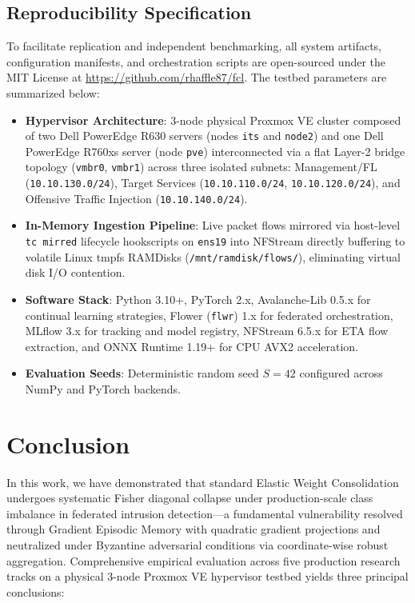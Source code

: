 \documentclass[journal,10pt,twocolumn]{IEEEtran}
\begin{document}
\subsection*{Reproducibility Specification}
To facilitate replication and independent benchmarking, all system artifacts, configuration manifests, and orchestration scripts are open-sourced under the MIT License at \url{https://github.com/rhaffle87/fcl}. The testbed parameters are summarized below:
\begin{itemize}
    \item \textbf{Hypervisor Architecture}: 3-node physical Proxmox VE cluster composed of two Dell PowerEdge R630 servers (nodes \texttt{its} and \texttt{node2}) and one Dell PowerEdge R760xs server (node \texttt{pve}) interconnected via a flat Layer-2 bridge topology (\texttt{vmbr0}, \texttt{vmbr1}) across three isolated subnets: Management/FL (\texttt{10.10.130.0/24}), Target Services (\texttt{10.10.110.0/24}, \texttt{10.10.120.0/24}), and Offensive Traffic Injection (\texttt{10.10.140.0/24}).
    \item \textbf{In-Memory Ingestion Pipeline}: Live packet flows mirrored via host-level \texttt{tc mirred} lifecycle hookscripts on \texttt{ens19} into NFStream directly buffering to volatile Linux tmpfs RAMDisks (\texttt{/mnt/ramdisk/flows/}), eliminating virtual disk I/O contention.
    \item \textbf{Software Stack}: Python 3.10+, PyTorch 2.x, Avalanche-Lib 0.5.x for continual learning strategies, Flower (\texttt{flwr}) 1.x for federated orchestration, MLflow 3.x for tracking and model registry, NFStream 6.5.x for ETA flow extraction, and ONNX Runtime 1.19+ for CPU AVX2 acceleration.
    \item \textbf{Evaluation Seeds}: Deterministic random seed $S=42$ configured across NumPy and PyTorch backends.
\end{itemize}

\section{Conclusion}
\balance

In this work, we have demonstrated that standard Elastic Weight Consolidation undergoes systematic Fisher diagonal collapse under production-scale class imbalance in federated intrusion detection---a fundamental vulnerability resolved through Gradient Episodic Memory with quadratic gradient projections and neutralized under Byzantine adversarial conditions via coordinate-wise robust aggregation. Comprehensive empirical evaluation across five production research tracks on a physical 3-node Proxmox VE hypervisor testbed yields three principal conclusions:
\end{document}
